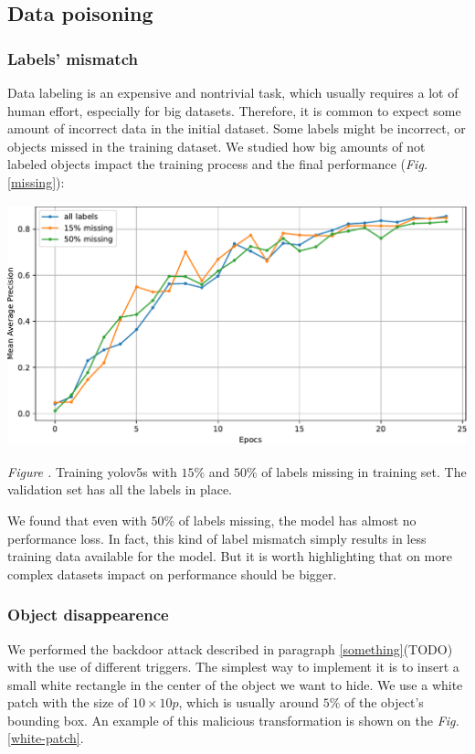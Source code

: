 \documentclass[14pt,a4paper]{extarticle}
\newcounter{e}
\newcounter{pic}
\newcommand{\pic}[1]{\refstepcounter{pic} \vspace{-0.3cm}\textit{Figure \arabic{pic}\label{#1}.}}
\numberwithin{equation}{section}
\numberwithin{figure}{section}
\begin{document}
\subsection{Data poisoning}
\subsubsection{Labels' mismatch}
Data labeling is an expensive and nontrivial task, which usually requires a lot of human effort, especially for big datasets. Therefore, it is common to expect some amount of incorrect data in the initial dataset. Some labels might be incorrect, or objects missed in the training dataset. We studied how big amounts of not labeled objects impact the training process and the final performance (\textit{Fig.} \ref{missing}):
\begin{center}
    \includegraphics[height=7cm]{images/missing.pdf}
\end{center}
\begin{center}
    \pic{missing} Training yolov5s with $15\%$ and $50\%$ of labels missing in training set. The validation set has all the labels in place.
\end{center}
We found that even with $50\%$ of labels missing, the model has almost no performance loss. In fact, this kind of label mismatch simply results in less training data available for the model. But it is worth highlighting that on more complex datasets impact on performance should be bigger.  

\subsubsection{Object disappearence}
We performed the backdoor attack described in paragraph \ref{something}(TODO) with the use of different triggers. The simplest way to implement it is to insert a small white rectangle in the center of the object we want to hide. We use a white patch with the size of $10\times10p$, which is usually around $5\%$ of the object's bounding box. An example of this malicious transformation is shown on the \textit{Fig.} \ref{white-patch}.
\end{document}
